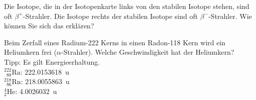 \documentclass[12pt,a4paper,twoside]{article}
\newcommand{\Kern}[3]{$^{#1}_{\phantom{1}#2}\text{#3}$}
\begin{document}
\begin{aufgabe}
	Die Isotope, die in der Isotopenkarte links von den stabilen Isotope stehen, sind oft $\beta^{+}$-Strahler.
	Die Isotope rechts der stabilen Isotope sind oft $\beta^{-}$-Strahler. Wie können Sie sich das erklären?
\end{aufgabe}

\begin{aufgabe}
	Beim Zerfall eines Radium-222 Kerns in einen Radon-118 Kern wird ein Heliumkern frei ($\alpha$-Strahler).
	Welche Geschwindigkeit hat der Heliumkern? \\
	Tipp: Es gilt Energieerhaltung.\\
	\Kern{222}{88}{Ra}: \SI{222.0153618}{u}\\
	\Kern{218}{86}{Rn}: \SI{218.0055863}{u}\\
	$^4_2\text{He}$: \SI{4.0026032}{u}
\end{aufgabe}
\end{document}
